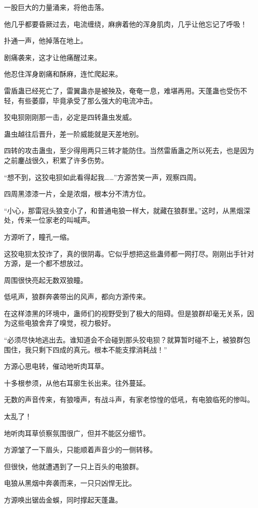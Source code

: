 \begin{this_body}
一股巨大的力量涌来，将他击落。

他几乎都要昏厥过去，电流缠绕，麻痹着他的浑身肌肉，几乎让他忘记了呼吸！

扑通一声，他掉落在地上。

剧痛袭来，这才让他痛醒过来。

他忍住浑身剧痛和酥麻，连忙爬起来。

雷盾蛊已经死亡了，雷翼蛊亦是被殃及，奄奄一息，难堪再用。天蓬蛊也受伤不轻，有些萎靡，毕竟承受了那么强大的电流冲击。

狡电狈刚刚那一击，必定是四转蛊虫发威。

蛊虫越往后晋升，差一阶威能就是天差地别。

四转的攻击蛊虫，至少得用两只三转才能防住。当然雷盾蛊之所以死去，也是因为之前鏖战很久，积累了许多伤势。

“想不到，这狡电狈如此看得起我……”方源苦笑一声，观察四周。

四周黑漆漆一片，全是浓烟，根本分不清方位。

“小心，那雷冠头狼变小了，和普通电狼一样大，就藏在狼群里。”这时，从黑烟深处，传来一位家老的叫喊声。

方源听了，瞳孔一缩。

这狡电狈太狡诈了，真的很阴毒。它似乎想把这些蛊师都一网打尽。刚刚出手针对方源，是一个都不想放过。

周围很快亮起无数双狼瞳。

低吼声，狼群奔袭带出的风声，都向方源传来。

在这样漆黑的环境中，蛊师们的视野受到了极大的阻碍。但是狼群却毫无关系，因为这些电狼舍弃了嗅觉，视力极好。

“必须尽快地逃出去。谁知道会不会碰到那头狡电狈？就算暂时碰不上，被狼群包围住，我只剩下四成的真元。根本不能支撑消耗战！”

方源心思电转，催动地听肉耳草。

十多根参须，从他右耳廓生长出来。往外蔓延。

无数的声音传来，有狼嚎声，有战斗声，有家老惊惶的低吼，有电狼临死的惨叫。

太乱了！

地听肉耳草侦察氛围很广，但并不能区分细节。

方源皱了一下眉头，只能顺着声音少的一侧转移。

但很快，他就遭遇到了一只上百头的电狼群。

电狼从黑烟中奔袭而来，一只只凶悍无比。

方源唤出锯齿金蜈，同时撑起天蓬蛊。


\end{this_body}
